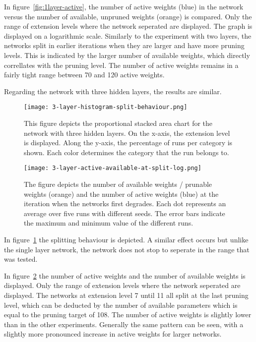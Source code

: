 In figure~\ref{fig:1layer-active}, the number of active weights (blue) in the network versus the number of available, unpruned weights (orange) is compared.
Only the range of extension levels where the network seperated are displayed.
The graph is displayed on a logarithmic scale.
Similarly to the experiment with two layers, the networks split in earlier iterations when they are larger and have more pruning levels.
This is indicated by the larger number of available weights, which directly correllates with the pruning level.
The number of active weights remains in a fairly tight range between 70 and 120 active weights.

Regarding the network with three hidden layers, the results are similar.
\begin{figure}[ht]
    \centering
    \texttt{[image: 3-layer-histogram-split-behaviour.png]}
    \caption{
        This figure depicts the proportional stacked area chart for the network with three hidden layers.
        On the x-axis, the extension level is displayed. 
        Along the y-axis, the percentage of runs per category is shown.
        Each color determines the category that the run belongs to.
    }\label{fig:3layer-histogram}
\end{figure}

\begin{figure}[ht] 
    \centering
    \texttt{[image: 3-layer-active-available-at-split-log.png]}
    \caption{
        The figure depicts the number of available weights / prunable weights (orange) and the number of active weights (blue) at the iteration when the networks first degrades.
    Each dot represents an average over five runs with different seeds.
    The error bars indicate the maximum and minimum value of the different runs.
    }\label{fig:3layer-active}
\end{figure}

In figure~\ref{fig:3layer-histogram} the splitting behaviour is depicted.
A similar effect occurs but unlike the single layer network, the network does not stop to seperate in the range that was tested. 

In figure~\ref{fig:3layer-active} the number of active weights and the number of available weights is displayed.
Only the range of extension levels where the network seperated are displayed.
The networks at extension level 7 until 11 all split at the last pruning level, which can be deducted by the number of available parameters which is equal to the pruning target of 108.
The number of active weights is slightly lower than in the other experiments.
Generally the same pattern can be seen, with a slightly more pronounced increase in active weights for larger networks.

